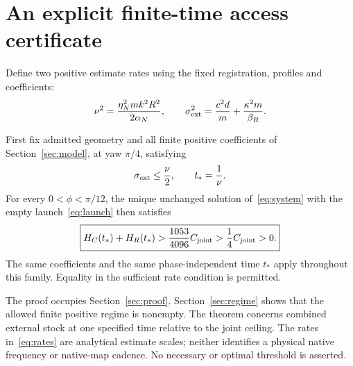 \section{An explicit finite-time access certificate}\label{sec:theorem}
Define two positive estimate rates using the fixed registration, profiles and coefficients:
\begin{equation}\label{eq:rates}%
\nu^2=\frac{\eta_N^2mk^2R^2}{2\alpha_N},
\qquad
\sigma_{\rm ext}^2=\frac{c^2d}{m}+\frac{\kappa^2m}{\beta_R}.
\end{equation}
\begin{theorem}\label{thm:access}%
First fix admitted geometry and all finite positive coefficients of Section~\ref{sec:model}, at yaw $\pi/4$, satisfying
\begin{equation}\label{eq:condition}%
\sigma_{\rm ext}\le\frac{\nu}{2},\qquad t_*=\frac1\nu.
\end{equation}
For every $0<\phi<\pi/12$, the unique unchanged solution of~\eqref{eq:system} with the empty launch~\eqref{eq:launch} then satisfies
\begin{equation}\label{eq:certificate}%
\boxed{H_C(t_*)+H_R(t_*)>
\frac{1053}{4096}C_{\rm joint}>
\frac14 C_{\rm joint}>0.}
\end{equation}
The same coefficients and the same phase-independent time $t_*$ apply throughout this family. Equality in the sufficient rate condition is permitted.
\end{theorem}

The proof occupies Section~\ref{sec:proof}. Section~\ref{sec:regime} shows that the allowed finite positive regime is nonempty. The theorem concerns combined external stock at one specified time relative to the joint ceiling. The rates in~\eqref{eq:rates} are analytical estimate scales; neither identifies a physical native frequency or native-map cadence. No necessary or optimal threshold is asserted.
